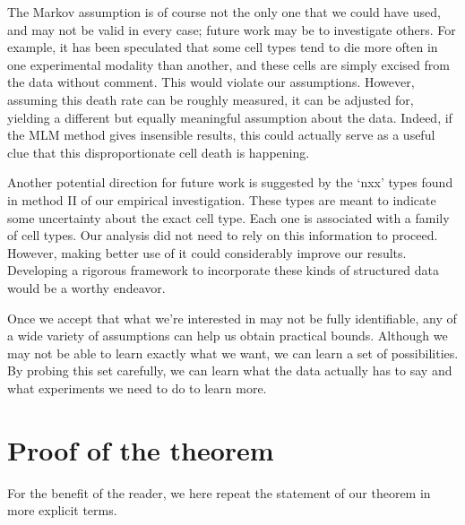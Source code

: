 The Markov assumption is of course not the only one that we could have used, and may not be valid in every case; future work may be to investigate others.  For example, it has been speculated that some cell types tend to die more often in one experimental modality than another, and these cells are simply excised from the data without comment.  This would violate our assumptions.  However, assuming this death rate can be roughly measured, it can be adjusted for, yielding a different but equally meaningful assumption about the data.  Indeed, if the MLM method gives insensible results, this could actually serve as a useful clue that this disproportionate cell death is happening.

Another potential direction for future work is suggested by the `nxx' types found in method II of our empirical investigation.  These types are meant to indicate some uncertainty about the exact cell type.  Each one is associated with a family of cell types.  Our analysis did not need to rely on this information to proceed.  However, making better use of it could considerably improve our results.  Developing a rigorous framework to incorporate these kinds of structured data would be a worthy endeavor.

Once we accept that what we're interested in may not be fully identifiable, any of a wide variety of assumptions can help us obtain practical bounds.  Although we may not be able to learn exactly what we want, we can learn a set of possibilities.  By probing this set carefully, we can learn what the data actually has to say and what experiments we need to do to learn more.  




\appendix


\section{Proof of the theorem}

\label{sec:proof}

For the benefit of the reader, we here repeat the statement of our theorem in more explicit terms.  

